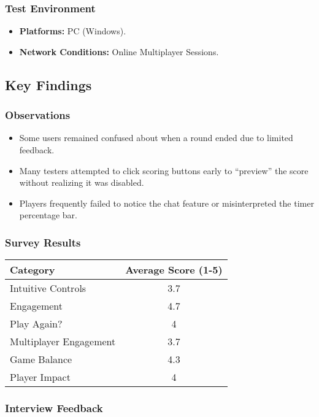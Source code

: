 \documentclass[12pt, titlepage]{article}
\begin{document}
\subsubsection{Test Environment}
\begin{itemize}
    \item \textbf{Platforms:} PC (Windows).
    \item \textbf{Network Conditions:} Online Multiplayer Sessions.
\end{itemize}

\subsection{Key Findings}

\subsubsection{Observations}
\begin{itemize}
    \item Some users remained confused about when a round ended due to limited feedback.
    \item Many testers attempted to click scoring buttons early to “preview” the score without realizing it was disabled.
    \item Players frequently failed to notice the chat feature or misinterpreted the timer percentage bar.
\end{itemize}


\subsubsection{Survey Results}
\begin{longtable}{|p{7cm}|c|}
\hline
\textbf{Category} & \textbf{Average Score (1-5)} \\
\hline
Intuitive Controls & 3.7 \\
\hline
Engagement & 4.7 \\
\hline
Play Again? & 4 \\
\hline
Multiplayer Engagement & 3.7 \\
\hline
Game Balance & 4.3 \\
\hline
Player Impact & 4 \\
\hline
\end{longtable}

\subsubsection{Interview Feedback}
\end{document}

